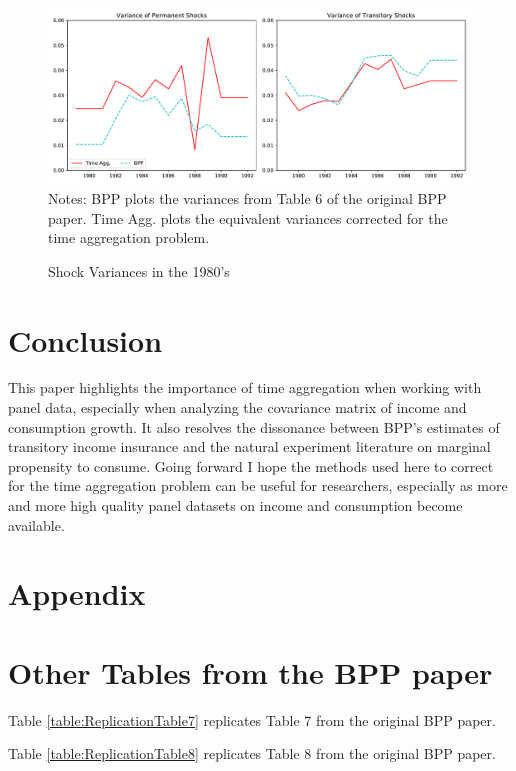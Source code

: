 

\begin{figure}
	\caption{Shock Variances in the 1980's}
	\label{figure:shockVariance}
	\includegraphics[width=1\textwidth]{./Chapter1/Figures/ShockVariances1980s.pdf}
	\footnotesize Notes: BPP plots the variances from Table 6 of the original BPP paper. Time Agg. plots the equivalent variances corrected for the time aggregation problem.
\end{figure}

\section{Conclusion}
This paper highlights the importance of time aggregation when working with panel data, especially when analyzing the covariance matrix of income and consumption growth. It also resolves the dissonance between BPP's estimates of transitory income insurance and the natural experiment literature on marginal propensity to consume. Going forward I hope the methods used here to correct for the time aggregation problem can be useful for researchers, especially as more and more high quality panel datasets on income and consumption become available.


%

\pagebreak

\section*{Appendix}





\section{Other Tables from the BPP paper} \label{table_appendix}
Table \ref{table:ReplicationTable7} replicates Table 7 from the original BPP paper.

 

Table \ref{table:ReplicationTable8} replicates Table 8 from the original BPP paper.








